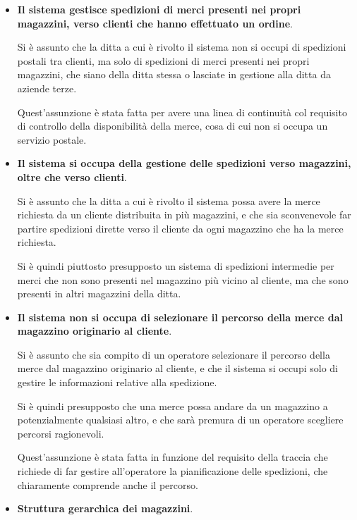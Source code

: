 \begin{itemize}
  \item \textbf{Il sistema gestisce spedizioni di merci presenti nei propri magazzini, verso clienti che hanno effettuato un ordine}.
  
  Si è assunto che la ditta a cui è rivolto il sistema non si occupi di spedizioni postali tra clienti, ma solo di spedizioni di merci presenti nei propri magazzini, che siano della ditta stessa o lasciate in gestione alla ditta da aziende terze.

  Quest'assunzione è stata fatta per avere una linea di continuità col requisito di controllo della disponibilità della merce, cosa di cui non si occupa un servizio postale.

  \item  \textbf{Il sistema si occupa della gestione delle spedizioni verso magazzini, oltre che verso clienti}.
  
  Si è assunto che la ditta a cui è rivolto il sistema possa avere la merce richiesta da un cliente distribuita in più magazzini, e che sia sconvenevole far partire spedizioni dirette verso il cliente da ogni magazzino che ha la merce richiesta.

  Si è quindi piuttosto presupposto un sistema di spedizioni intermedie per merci che non sono presenti nel magazzino più vicino al cliente, ma che sono presenti in altri magazzini della ditta.

  \item \textbf{Il sistema non si occupa di selezionare il percorso della merce dal magazzino originario al cliente}.
  
  Si è assunto che sia compito di un operatore  selezionare il percorso della merce dal magazzino originario al cliente, e che il sistema si occupi solo di gestire le informazioni relative alla spedizione.

  Si è quindi presupposto che una merce possa andare da un magazzino a potenzialmente qualsiasi altro, e che sarà premura di un operatore scegliere percorsi ragionevoli.

  Quest'assunzione è stata fatta in funzione del requisito della traccia che richiede di far gestire all'operatore la pianificazione delle spedizioni, che chiaramente comprende anche il percorso.

  \newpage
  \item \textbf{Struttura gerarchica dei magazzini}.
  

\end{itemize}
